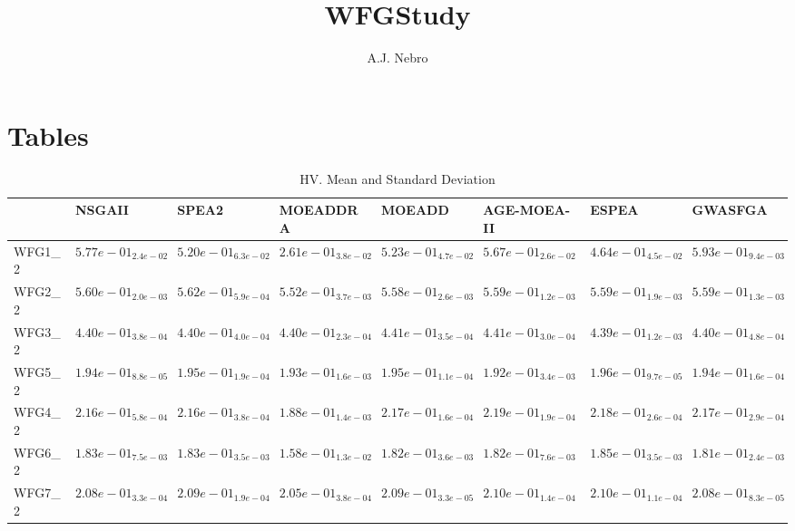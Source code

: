 \documentclass{article}
\title{WFGStudy}
\author{A.J. Nebro}
\begin{document}
\maketitle


\section{Tables}
\begin{landscape}
\begin{table}
\caption{HV. Mean and Standard Deviation}
\label{table: HV}
\centering
\begin{scriptsize}
\begin{tabular}{llllllll}
\hline & NSGAII & SPEA2 & MOEADDRA & MOEADD & AGE-MOEA-II & ESPEA &  GWASFGA\\
\hline 
WFG1\_2 & \cellcolor{gray25}$  5.77e-01_{ 2.4e-02}$ & $  5.20e-01_{ 6.3e-02}$ & $  2.61e-01_{ 3.8e-02}$ & $  5.23e-01_{ 4.7e-02}$ & $  5.67e-01_{ 2.6e-02}$ & $  4.64e-01_{ 4.5e-02}$ & \cellcolor{gray95}$  5.93e-01_{ 9.4e-03}$ \\
WFG2\_2 & \cellcolor{gray25}$  5.60e-01_{ 2.0e-03}$ & \cellcolor{gray95}$  5.62e-01_{ 5.9e-04}$ & $  5.52e-01_{ 3.7e-03}$ & $  5.58e-01_{ 2.6e-03}$ & $  5.59e-01_{ 1.2e-03}$ & $  5.59e-01_{ 1.9e-03}$ & $  5.59e-01_{ 1.3e-03}$ \\
WFG3\_2 & $  4.40e-01_{ 3.8e-04}$ & $  4.40e-01_{ 4.0e-04}$ & $  4.40e-01_{ 2.3e-04}$ & \cellcolor{gray25}$  4.41e-01_{ 3.5e-04}$ & \cellcolor{gray95}$  4.41e-01_{ 3.0e-04}$ & $  4.39e-01_{ 1.2e-03}$ & $  4.40e-01_{ 4.8e-04}$ \\
WFG5\_2 & $  1.94e-01_{ 8.8e-05}$ & \cellcolor{gray25}$  1.95e-01_{ 1.9e-04}$ & $  1.93e-01_{ 1.6e-03}$ & $  1.95e-01_{ 1.1e-04}$ & $  1.92e-01_{ 3.4e-03}$ & \cellcolor{gray95}$  1.96e-01_{ 9.7e-05}$ & $  1.94e-01_{ 1.6e-04}$ \\
WFG4\_2 & $  2.16e-01_{ 5.8e-04}$ & $  2.16e-01_{ 3.8e-04}$ & $  1.88e-01_{ 1.4e-03}$ & $  2.17e-01_{ 1.6e-04}$ & \cellcolor{gray95}$  2.19e-01_{ 1.9e-04}$ & \cellcolor{gray25}$  2.18e-01_{ 2.6e-04}$ & $  2.17e-01_{ 2.9e-04}$ \\
WFG6\_2 & \cellcolor{gray25}$  1.83e-01_{ 7.5e-03}$ & $  1.83e-01_{ 3.5e-03}$ & $  1.58e-01_{ 1.3e-02}$ & $  1.82e-01_{ 3.6e-03}$ & $  1.82e-01_{ 7.6e-03}$ & \cellcolor{gray95}$  1.85e-01_{ 3.5e-03}$ & $  1.81e-01_{ 2.4e-03}$ \\
WFG7\_2 & $  2.08e-01_{ 3.3e-04}$ & $  2.09e-01_{ 1.9e-04}$ & $  2.05e-01_{ 3.8e-04}$ & $  2.09e-01_{ 3.3e-05}$ & \cellcolor{gray95}$  2.10e-01_{ 1.4e-04}$ & \cellcolor{gray25}$  2.10e-01_{ 1.1e-04}$ & $  2.08e-01_{ 8.3e-05}$ \\

\end{tabular}
\end{scriptsize}
\end{table}
\end{landscape}
\end{document}

